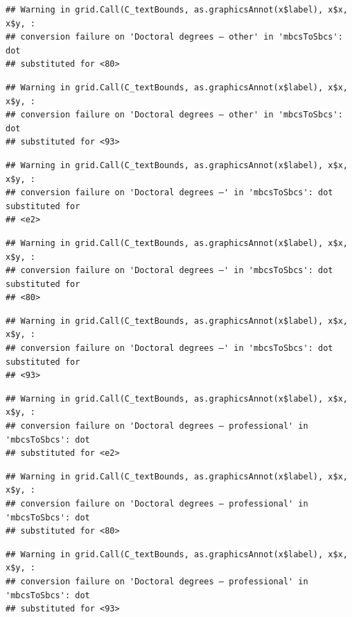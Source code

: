 \documentclass[
]{book}
\begin{document}
\begin{verbatim}
## Warning in grid.Call(C_textBounds, as.graphicsAnnot(x$label), x$x, x$y, :
## conversion failure on 'Doctoral degrees – other' in 'mbcsToSbcs': dot
## substituted for <80>
\end{verbatim}

\begin{verbatim}
## Warning in grid.Call(C_textBounds, as.graphicsAnnot(x$label), x$x, x$y, :
## conversion failure on 'Doctoral degrees – other' in 'mbcsToSbcs': dot
## substituted for <93>
\end{verbatim}

\begin{verbatim}
## Warning in grid.Call(C_textBounds, as.graphicsAnnot(x$label), x$x, x$y, :
## conversion failure on 'Doctoral degrees –' in 'mbcsToSbcs': dot substituted for
## <e2>
\end{verbatim}

\begin{verbatim}
## Warning in grid.Call(C_textBounds, as.graphicsAnnot(x$label), x$x, x$y, :
## conversion failure on 'Doctoral degrees –' in 'mbcsToSbcs': dot substituted for
## <80>
\end{verbatim}

\begin{verbatim}
## Warning in grid.Call(C_textBounds, as.graphicsAnnot(x$label), x$x, x$y, :
## conversion failure on 'Doctoral degrees –' in 'mbcsToSbcs': dot substituted for
## <93>
\end{verbatim}

\begin{verbatim}
## Warning in grid.Call(C_textBounds, as.graphicsAnnot(x$label), x$x, x$y, :
## conversion failure on 'Doctoral degrees – professional' in 'mbcsToSbcs': dot
## substituted for <e2>
\end{verbatim}

\begin{verbatim}
## Warning in grid.Call(C_textBounds, as.graphicsAnnot(x$label), x$x, x$y, :
## conversion failure on 'Doctoral degrees – professional' in 'mbcsToSbcs': dot
## substituted for <80>
\end{verbatim}

\begin{verbatim}
## Warning in grid.Call(C_textBounds, as.graphicsAnnot(x$label), x$x, x$y, :
## conversion failure on 'Doctoral degrees – professional' in 'mbcsToSbcs': dot
## substituted for <93>
\end{verbatim}
\end{document}
